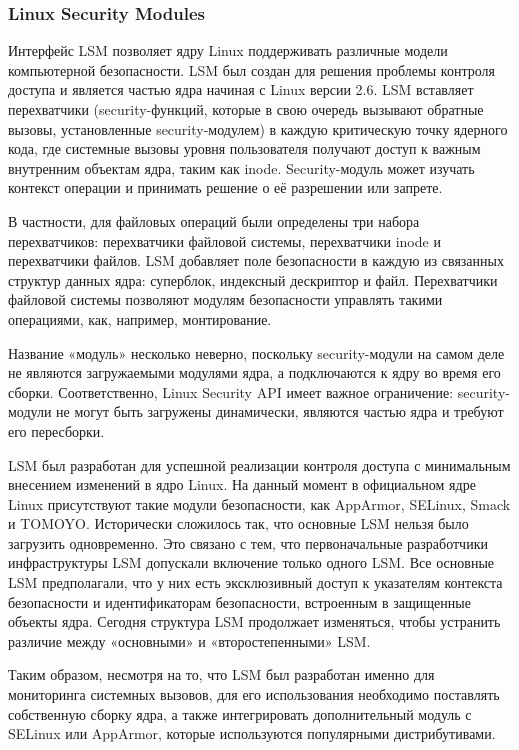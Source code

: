 \documentclass[a4paper,14pt]{article}
\begin{document}
\subsubsection{Linux Security Modules}

Интерфейс LSM позволяет ядру Linux поддерживать различные модели компьютерной безопасности. LSM был создан для решения проблемы контроля доступа и является частью ядра начиная с Linux версии 2.6. LSM вставляет перехватчики (security-функций, которые в свою очередь вызывают обратные вызовы, установленные security-модулем) в каждую критическую точку ядерного кода, где системные вызовы уровня пользователя получают доступ к важным внутренним объектам ядра, таким как inode. Security-модуль может изучать контекст операции и принимать решение о её разрешении или запрете.

В частности, для файловых операций были определены три набора перехватчиков: перехватчики файловой системы, перехватчики inode и перехватчики файлов. LSM добавляет поле безопасности в каждую из связанных структур данных ядра: суперблок, индексный дескриптор и файл. Перехватчики файловой системы позволяют модулям безопасности управлять такими операциями, как, например, монтирование.

Название «модуль» несколько неверно, поскольку security-модули на самом деле не являются загружаемыми модулями ядра, а подключаются к ядру во время его сборки. Соответственно, Linux Security API имеет важное ограничение: security-модули не могут быть загружены динамически, являются частью ядра и требуют его пересборки.

LSM был разработан для успешной реализации контроля доступа с минимальным внесением изменений в ядро Linux. 
На данный момент в официальном ядре Linux присутствуют такие модули безопасности, как AppArmor, SELinux, Smack и TOMOYO. Исторически сложилось так, что основные LSM нельзя было загрузить одновременно. Это связано с тем, что первоначальные разработчики инфраструктуры LSM допускали включение только одного LSM. Все основные LSM предполагали, что у них есть эксклюзивный доступ к указателям контекста безопасности и идентификаторам безопасности, встроенным в защищенные объекты ядра. Сегодня структура LSM продолжает изменяться, чтобы устранить различие между «основными» и «второстепенными» LSM. 

Таким образом, несмотря на то, что LSM был разработан именно для мониторинга системных вызовов, для его использования необходимо поставлять собственную сборку ядра, а также интегрировать дополнительный модуль с SELinux или AppArmor, которые используются популярными дистрибутивами.
\end{document}
